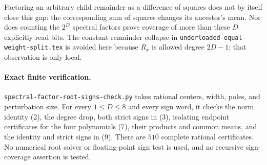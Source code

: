 \documentclass[11pt]{article}
\begin{document}
Factoring an arbitrary child remainder as a difference of squares
does not by itself close this gap: the corresponding sum of squares
changes its ancestor's mean. Nor does counting the $2^D$ spectral
factors prove coverage of more than these $D$ explicitly read bits.
The constant-remainder collapse in
\texttt{underloaded-equal-weight-split.tex} is avoided here because
$R_\sigma$ is allowed degree $2D-1$; that observation is only local.

\paragraph{Exact finite verification.}
\texttt{spectral-factor-root-signs-check.py} takes rational centers,
width, poles, and perturbation size. For every $1\leq D\leq8$ and
every sign word, it checks the norm identity (2), the degree drop,
both strict signs in (3), isolating endpoint certificates for the
four polynomials (7), their products and common means, and the
identity and strict signs in (9). There are $510$ complete rational
certificates. No numerical root solver or floating-point sign test
is used, and no recursive sign-coverage assertion is tested.
\end{document}
